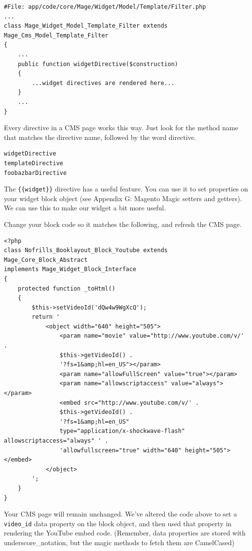 \documentclass[oneside]{book}
\begin{document}
\begin{lstlisting}
#File: app/code/core/Mage/Widget/Model/Template/Filter.php
...
class Mage_Widget_Model_Template_Filter extends Mage_Cms_Model_Template_Filter
{
    ...
    public function widgetDirective($construction)
    {
        ...widget directives are rendered here...
    }
    ...
}

\end{lstlisting}


Every directive in a CMS page works this way.  Just look for the method name that matches the directive name, followed by the word directive.

\begin{lstlisting}
widgetDirective
templateDirective
foobazbarDirective

\end{lstlisting}


The \footnotesize\texttt{\{\{widget\}\}} \normalsize  directive has a useful feature. You can use it to set properties on your widget block object (see Appendix G: Magento Magic setters and getters).  We can use this to make our widget a bit more useful.

Change your block code so it matches the following, and refresh the CMS page.

\begin{lstlisting}
<?php
class Nofrills_Booklayout_Block_Youtube extends Mage_Core_Block_Abstract
implements Mage_Widget_Block_Interface
{
    protected function _toHtml()
    {
        $this->setVideoId('dQw4w9WgXcQ');
        return '
            <object width="640" height="505">
                <param name="movie" value="http://www.youtube.com/v/' .
                $this->getVideoId() .
                '?fs=1&amp;hl=en_US"></param>
                <param name="allowFullScreen" value="true"></param>
                <param name="allowscriptaccess" value="always"></param>
                <embed src="http://www.youtube.com/v/' .
                $this->getVideoId() .
                '?fs=1&amp;hl=en_US"
                type="application/x-shockwave-flash" allowscriptaccess="always" ' .
                'allowfullscreen="true" width="640" height="505"></embed>
            </object>
        ';
    }
}

\end{lstlisting}


Your CMS page will remain unchanged.  We've altered the code above to set a \footnotesize\texttt{video\_id} \normalsize  data property on the block object, and then used that property in rendering the YouTube embed code. (Remember, data properties are stored with underscore\_notation, but the magic methods to fetch them are CamelCased)
\end{document}
